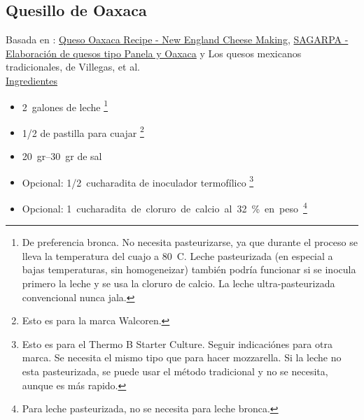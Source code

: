 \subsection{Quesillo de Oaxaca}

Basada en : \href{https://cheesemaking.com/products/queso-oaxaca-recipe}{Queso Oaxaca Recipe - New England Cheese Making}, \href{http://www.sagarpa.gob.mx/desarrolloRural/Documents/fichasaapt/Elaboraci%C3%B3n%20de%20quesos.pdf}{SAGARPA - Elaboración de quesos tipo Panela y Oaxaca} y Los quesos mexicanos tradicionales, de Villegas, et al. \\

\underline{Ingredientes}
\begin{itemize}
\item \SI{2}{galones} de leche \footnote{De preferencia bronca. No necesita pasteurizarse, ya que durante el proceso se lleva la temperatura del cuajo a \SI{80}{C}. Leche pasteurizada (en especial a bajas temperaturas, sin homogeneizar) también podría funcionar si se inocula primero la leche y se usa la cloruro de calcio. La leche ultra-pasteurizada convencional nunca jala.}
\item \num{1/2} de pastilla para cuajar \footnote{Esto es para la marca Walcoren.} 
\item \SIrange{20}{30}{gr} de sal
\item Opcional: \SI{1/2}{cucharadita} de inoculador termofílico \footnote{Esto es para el Thermo B Starter Culture. Seguir indicaciónes para otra marca. Se necesita el mismo tipo que para hacer mozzarella. Si la leche no esta pasteurizada, se puede usar el método tradicional y no se necesita, aunque es más rapido.}
\item Opcional: \SI{1} cucharadita de cloruro de calcio al 32\% en peso \footnote{Para leche pasteurizada, no se necesita para leche bronca.}
\end{itemize}


